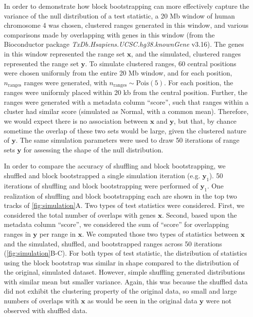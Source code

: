 \documentclass{article}
\begin{document}
  In order to demonstrate how block bootstrapping can more effectively
  capture the variance of the null distribution of a test statistic,
  a 20 Mb window of human chromosome 4 was chosen, clustered ranges
  generated in this window, and various comparisons made by
  overlapping with genes in this window (from the Bioconductor package
  \textit{TxDb.Hsapiens.UCSC.hg38.knownGene} v3.16).
  The genes in this window represented the range
  set $\bm{x}$, and the simulated, clustered ranges represented the
  range set $\bm{y}$.
  To simulate clustered ranges, 60 central positions were chosen
  uniformly from the entire 20 Mb window, and
  for each position, $n_{\textrm{ranges}}$ ranges
  were generated, with $n_{\textrm{ranges}} \sim \textrm{Pois}(5)$.
  For each position, the ranges were uniformly placed within 20 kb
  from the central position. Further, the ranges were generated with a
  metadata column ``score'', such that ranges within a cluster had
  similar score (simulated as Normal, with a common mean).
  Therefore, we would expect there is no
  association between $\bm{x}$ and $\bm{y}$, but that, by chance
  sometime the overlap of these two sets would be large, given the
  clustered nature of $\bm{y}$.
  The same simulation parameters were used to draw 50 iterations of
  range sets $\bm{y}$ for assessing the shape of the null
  distribution.
  

  In order to compare the
  accuracy of shuffling and block bootstrapping, we shuffled and block
  bootstrapped a single simulation iteration (e.g. $\bm{y}_1$).
  50 iterations of shuffling and block bootstrapping were performed of
  $\bm{y}_1$.
  One realization of shuffling and block bootstrapping each are shown
  in the top two tracks of \cref{fig:simulation}A.
  Two types of test statistics were considered.
  First, we considered
  the total number of overlaps with genes $\bm{x}$.
  Second, based upon the metadata column ``score'',
  we considered the sum of ``score'' for overlapping ranges in
  $\bm{y}$ per range in $\bm{x}$.
  We computed those two types of
  statistics between $\bm{x}$ and the simulated, shuffled, and bootstrapped
  ranges across 50 iterations (\cref{fig:simulation}B-C). For both
  types of test statistic, the distribution of statistics using the
  block bootstrap was similar in shape compared
  to the distribution of the original, simulated dataset.
  However, simple shuffling generated distributions with similar mean
  but smaller variance. Again, this was because the shuffled data did
  not exhibit the clustering property of the original data, so small
  and large numbers of overlaps with $\bm{x}$ as would be seen in the
  original data $\bm{y}$ were not observed with shuffled data.
\end{document}
